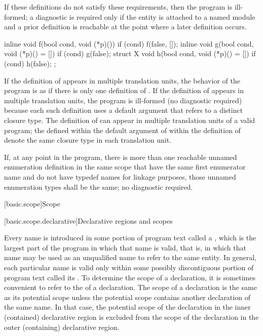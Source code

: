 \pnum
If these definitions do not satisfy these requirements,
then the program is ill-formed;
a diagnostic is required only if
the entity is attached to a named module and
a prior definition is reachable at the point where a later definition occurs.

\pnum
\begin{example}
\begin{codeblock}
inline void f(bool cond, void (*p)()) {
  if (cond) f(false, []{});
}
inline void g(bool cond, void (*p)() = []{}) {
  if (cond) g(false);
}
struct X {
  void h(bool cond, void (*p)() = []{}) {
    if (cond) h(false);
  }
};
\end{codeblock}

If the definition of  appears in multiple translation units,
the behavior of the program is as if
there is only one definition of .
If the definition of  appears in multiple translation units,
the program is ill-formed (no diagnostic required) because
each such definition uses a default argument that
refers to a distinct  closure type.
The definition of  can appear
in multiple translation units of a valid program;
the  defined within
the default argument of  within the definition of 
denote the same closure type in each translation unit.
\end{example}

\pnum
If, at any point in the program,
there is more than one
reachable unnamed enumeration definition in the same scope
that have the same first enumerator name and
do not have typedef names for linkage purposes,
those unnamed enumeration types shall be the same; no diagnostic required.

[basic.scope]{Scope}%

[basic.scope.declarative]{Declarative regions and scopes}%

\pnum
{}%
Every name is introduced in some portion of program text called a
%
%
, which is the largest part of the program
in which that name is valid, that is, in which that name may
be used as an unqualified name to refer to the same entity. In general,
each particular name is valid only within some possibly discontiguous
portion of program text called its . To determine the
scope of a declaration, it is sometimes convenient to refer to the
 of a declaration. The scope of a declaration
is the same as its potential scope unless the potential scope contains
another declaration of the same name. In that case, the potential scope
of the declaration in the inner (contained) declarative region is
excluded from the scope of the declaration in the outer (containing)
declarative region.

